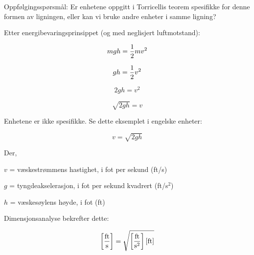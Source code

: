 \vskip 10pt

Oppfølgingsspørsmål: Er enhetene oppgitt i Torricellis teorem spesifikke for denne formen av ligningen, eller kan vi bruke andre enheter i samme ligning?







Etter energibevaringsprinsippet (og med neglisjert luftmotstand):

$$mgh = {1 \over 2}mv^2$$

$$gh = {1 \over 2}v^2$$

$$2gh = v^2$$

$$\sqrt{2gh} = v$$

\vskip 10pt

Enhetene er ikke spesifikke. Se dette eksemplet i engelske enheter:

$$v = \sqrt{2 g h}$$

\noindent
Der,

$v$ = væskestrømmens hastighet, i fot per sekund (ft/s)

$g$ = tyngdeakselerasjon, i fot per sekund kvadrert (ft/s$^{2}$)

$h$ = væskesøylens høyde, i fot (ft)

\vskip 10pt

Dimensjonsanalyse bekrefter dette:

$$\left[ \hbox{ft} \over \hbox{s} \right] = \sqrt{\left[ \hbox{ft} \over \hbox{s}^2 \right] \left[ \hbox{ft} \right]}$$


